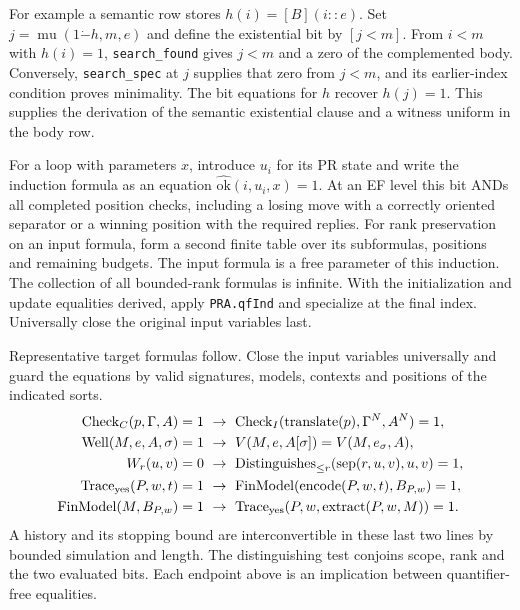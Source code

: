 For example a semantic row stores $h(i)=[B](i::e)$. Set $j=\operatorname{mu}(1\mathbin{\dot-}h,m,e)$ and define the existential bit by $[j<m]$. From $i<m$ with $h(i)=1$, \texttt{search\_found} gives $j<m$ and a zero of the complemented body. Conversely, \texttt{search\_spec} at $j$ supplies that zero from $j<m$, and its earlier-index condition proves minimality. The bit equations for $h$ recover $h(j)=1$. This supplies the derivation of the semantic existential clause and a witness uniform in the body row.

For a loop with parameters $x$, introduce $u_i$ for its PR state and write the induction formula as an equation $\widehat{\mathrm{ok}}(i,u_i,x)=1$. At an EF level this bit ANDs all completed position checks, including a losing move with a correctly oriented separator or a winning position with the required replies. For rank preservation on an input formula, form a second finite table over its subformulas, positions and remaining budgets. The input formula is a free parameter of this induction. The collection of all bounded-rank formulas is infinite. With the initialization and update equalities derived, apply \texttt{PRA.qfInd} and specialize at the final index. Universally close the original input variables last.

Representative target formulas follow. Close the input variables universally and guard the equations by valid signatures, models, contexts and positions of the indicated sorts.
\begin{align*}
 \mathrm{Check}_C(p,\Gamma,A)=1
   &\ \to\ \mathrm{Check}_I(\mathrm{translate}(p),\Gamma^N,A^N)=1,\\
 \mathrm{Well}(M,e,A,\sigma)=1
   &\ \to\ V(M,e,A[\sigma])=V(M,e_\sigma,A),\\
 W_r(u,v)=0
   &\ \to\ \mathrm{Distinguishes}_{\le r}(\mathrm{sep}(r,u,v),u,v)=1,\\
 \mathrm{Trace}_{\rm yes}(P,w,t)=1
   &\ \to\ \mathrm{FinModel}(\mathrm{encode}(P,w,t),B_{P,w})=1,\\
 \mathrm{FinModel}(M,B_{P,w})=1
   &\ \to\ \mathrm{Trace}_{\rm yes}(P,w,\mathrm{extract}(P,w,M))=1.
\end{align*}
A history and its stopping bound are interconvertible in these last two lines by bounded simulation and length. The distinguishing test conjoins scope, rank and the two evaluated bits. Each endpoint above is an implication between quantifier-free equalities.

